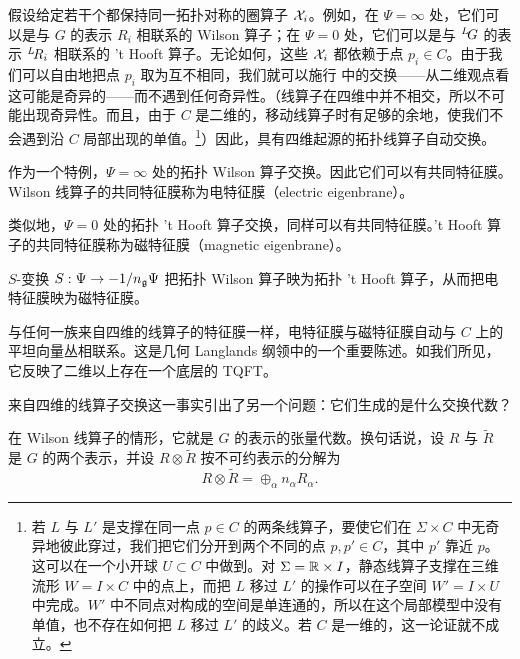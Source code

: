 假设给定若干个都保持同一拓扑对称的圈算子 $\EUX_i$。例如，在 $\Psi=\infty$ 处，它们可以是与 $G$ 的表示 $R_i$ 相联系的 Wilson 算子；在 $\Psi=0$ 处，它们可以是与 $^L\negthinspace G$ 的表示 $^L\negthinspace R_i$ 相联系的 't Hooft 算子。无论如何，这些 $\EUX_i$ 都依赖于点 $p_i\in C$。由于我们可以自由地把点 $p_i$ 取为互不相同，我们就可以施行 \quintamp 中的交换——从二维观点看这可能是奇异的——而不遇到任何奇异性。（线算子在四维中并不相交，所以不可能出现奇异性。而且，由于 $C$ 是二维的，移动线算子时有足够的余地，使我们不会遇到沿 $C$ 局部出现的单值。\footnote{若 $L$ 与 $L'$ 是支撑在同一点 $p\in C$ 的两条线算子，要使它们在 $\Sigma\times C$ 中无奇异地彼此穿过，我们把它们分开到两个不同的点 $p,p'\in C$，其中 $p'$ 靠近 $p$。这可以在一个小开球 $U\subset C$ 中做到。对 $\Sigma=\Bbb{R}\times I$，静态线算子支撑在三维流形 $W=I\times C$ 中的点上，而把 $L$ 移过 $L'$ 的操作可以在子空间 $W'=I\times U$ 中完成。$W'$ 中不同点对构成的空间是单连通的，所以在这个局部模型中没有单值，也不存在如何把 $L$ 移过 $L'$ 的歧义。若 $C$ 是一维的，这一论证就不成立。}）因此，具有四维起源的拓扑线算子自动交换。

\par{}

作为一个特例，$\Psi=\infty$ 处的拓扑 Wilson 算子交换。因此它们可以有共同特征膜。Wilson 线算子的共同特征膜称为电特征膜（electric eigenbrane）。

类似地，$\Psi=0$ 处的拓扑 't Hooft 算子交换，同样可以有共同特征膜。't Hooft 算子的共同特征膜称为磁特征膜（magnetic eigenbrane）。

$S$-变换 $S:\Psi\to -1/n_{\frak g}\Psi$ 把拓扑 Wilson 算子映为拓扑 't Hooft 算子，从而把电特征膜映为磁特征膜。

与任何一族来自四维的线算子的特征膜一样，电特征膜与磁特征膜自动与 $C$ 上的平坦向量丛相联系。这是几何 Langlands 纲领中的一个重要陈述。如我们所见，它反映了二维以上存在一个底层的 TQFT。

\par{}

来自四维的线算子交换这一事实引出了另一个问题：它们生成的是什么交换代数？

在 Wilson 线算子的情形，它就是 $G$ 的表示的张量代数。换句话说，设 $R$ 与 $\tilde R$ 是 $G$ 的两个表示，并设 $R\otimes \tilde R$ 按不可约表示的分解为 %
\setcounter{equation}{25}
\begin{equation}\label{eq:ico}
R\otimes \tilde R=\oplus_\alpha n_\alpha R_\alpha.
\end{equation}

